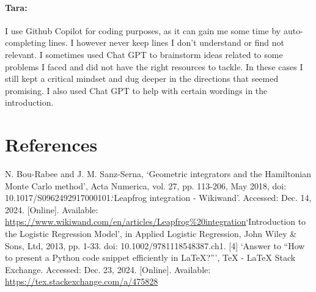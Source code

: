 \documentclass[a4paper, 12pt,oneside]{article}
\begin{document}
		\paragraph{Tara:}
		I use Github Copilot for coding purposes, as it can gain me some time by auto-completing lines. I however never keep lines I don't understand or find not relevant. I sometimes used Chat GPT to brainstorm ideas related to some problems I faced and did not have the right resources to tackle. In these cases I still kept a critical mindset and dug deeper in the directions that seemed promising. I also used Chat GPT to help with certain wordings in the introduction. 
	\section*{References}
	\noindent
	[1] N. Bou-Rabee and J. M. Sanz-Serna, `Geometric integrators and the Hamiltonian Monte Carlo method', Acta Numerica, vol. 27, pp. 113-206, May 2018, doi: 10.1017/S0962492917000101.\newline
	[2] `Leapfrog integration - Wikiwand'. Accessed: Dec. 14, 2024. [Online]. Available: \url{https://www.wikiwand.com/en/articles/Leapfrog%20integration}\newline
	[3] `Introduction to the Logistic Regression Model', in Applied Logistic Regression, John Wiley \& Sons, Ltd, 2013, pp. 1-33. doi: 10.1002/9781118548387.ch1.\newline
	[4] `Answer to “How to present a Python code snippet efficiently in LaTeX?”’, TeX - LaTeX Stack Exchange. Accessed: Dec. 23, 2024. [Online]. Available: \url{https://tex.stackexchange.com/a/475828}
	\appendix
\end{document}

